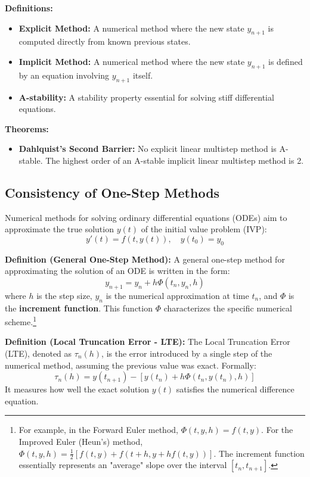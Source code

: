 \textbf{Definitions:}
\begin{itemize}
    \item \textbf{Explicit Method:} A numerical method where the new state $y_{n+1}$ is computed directly from known previous states.
    \item \textbf{Implicit Method:} A numerical method where the new state $y_{n+1}$ is defined by an equation involving $y_{n+1}$ itself.
    \item \textbf{A-stability:} A stability property essential for solving stiff differential equations.
\end{itemize}

\textbf{Theorems:}
\begin{itemize}
    \item \textbf{Dahlquist's Second Barrier:} No explicit linear multistep method is A-stable. The highest order of an A-stable implicit linear multistep method is 2.
\end{itemize}

\subsection{Consistency of One-Step Methods}

Numerical methods for solving ordinary differential equations (ODEs) aim to approximate the true solution $y(t)$ of the initial value problem (IVP):
\begin{equation}
    y'(t) = f(t, y(t)), \quad y(t_0) = y_0
\end{equation}

\textbf{Definition (General One-Step Method):} 
A general one-step method for approximating the solution of an ODE is written in the form:
\begin{equation}
    y_{n+1} = y_n + h \Phi(t_n, y_n, h)
\end{equation}
where $h$ is the step size, $y_n$ is the numerical approximation at time $t_n$, and $\Phi$ is the \textbf{increment function}. This function $\Phi$ characterizes the specific numerical scheme.\footnote{For example, in the Forward Euler method, $\Phi(t, y, h) = f(t, y)$. For the Improved Euler (Heun's) method, $\Phi(t, y, h) = \frac{1}{2}[f(t, y) + f(t+h, y + h f(t, y))]$. The increment function essentially represents an "average" slope over the interval $[t_n, t_{n+1}]$.}

\textbf{Definition (Local Truncation Error - LTE):} 
The Local Truncation Error (LTE), denoted as $\tau_n(h)$, is the error introduced by a single step of the numerical method, assuming the previous value was exact. Formally:
\begin{equation}
    \tau_n(h) = y(t_{n+1}) - [y(t_n) + h \Phi(t_n, y(t_n), h)]
\end{equation}
It measures how well the exact solution $y(t)$ satisfies the numerical difference equation.

